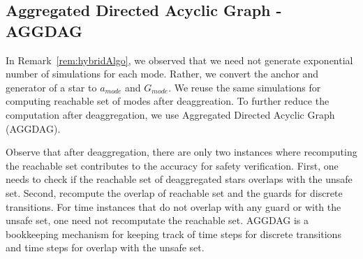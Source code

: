 \subsection{Aggregated Directed Acyclic Graph - AGGDAG}
\label{sec:aggdag}

In Remark~\ref{rem:hybridAlgo}, we observed that we need not generate exponential number of simulations for each mode. Rather, we convert the anchor and generator of a star to $a_{mode}$ and $G_{mode}$. We reuse the same simulations for computing reachable set of modes after deaggreation. To further reduce the computation after deaggregation, we use Aggregated Directed Acyclic Graph (AGGDAG).

Observe that after deaggregation, there are only two instances where recomputing the reachable set contributes to the accuracy for safety verification. First, one needs to check if the reachable set of deaggregated stars overlaps with the unsafe set. Second, recompute the overlap of reachable set and the guards for discrete transitions. For time instances that do not overlap with any guard or with the unsafe set, one need not recomputate the reachable set. AGGDAG is a bookkeeping mechanism for keeping track of time steps for discrete transitions and time steps for overlap with the unsafe set.
 
%

